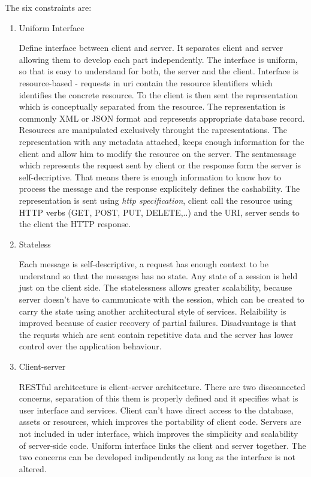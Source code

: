 \begin{description}
  \item The six constraints are:
  

\begin{enumerate}
  \item Uniform Interface
  
Define interface between client and server. It separates client and server allowing them to develop each part independently. The interface is uniform, so that is easy to understand for both, the server and the client.
Interface is resource-based - requests in \gls{uri} contain the resource identifiers which identifies the concrete resource. To the client is then sent the representation which is conceptually separated from the resource. The representation is commonly XML or JSON format and represents appropriate database record.
Resources are manipulated exclusively throught the rapresentations. The representation with any metadata attached, keeps enough information for the client and allow him to modify the resource on the server.
The sentmessage which represents the request sent by client or the response form the server is self-decriptive. That means there is enough information to know hov to process the message and the response explicitely defines the cashability.
The representation is sent using \emph{\gls{http} specification}, client call the resource using HTTP verbs (GET, POST, PUT, DELETE,..) and the URI, server sends to the client the HTTP response.

  \item Stateless
  
Each message is self-descriptive, a request has enough context to be understand so that the messages has no state. Any state of a \gls{session} is held just on the client side.
The statelessness allows greater scalability, because server doesn't have to cammunicate with the session, which can be created to carry the state using another architectural style of services. Relaibility is improved because of easier recovery of partial failures. Disadvantage is that the requsts which are sent contain repetitive data and the server has lower control over the application behaviour.

\item Client-server

RESTful architecture is client-server architecture. There are two disconnected concerns, separation of this them is properly defined and it specifies what is user interface and services. Client can’t have direct access to the database, assets or resources, which improves the portability of client code. Servers are not included in uder interface, which improves the simplicity and scalability of server-side code. Uniform interface links the client and server together. The two concerns can be developed indipendently as long as the interface is not altered. 


\end{enumerate}
\end{description}
